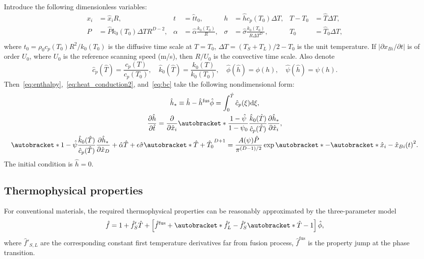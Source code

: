 \documentclass{article}
\newcommand{\dd}{\mathrm{d}}
\newcommand{\pder}[2][]{\frac{\partial#1}{\partial#2}}
\newcommand{\Pder}[2][]{\partial#1/\partial#2}
\DeclarePairedDelimiter\autobracket()       %
\newcommand{\br}[1]{\autobracket*{#1}}
\newcommand{\fusion}[1]{{#1}^\mathrm{fus}}
\begin{document}
Introduce the following dimensionless variables:
\begin{equation}\label{eq:dimensionless}
    \begin{aligned}
        x_i &= \hat{x}_iR, & t &= \hat{t}t_0, & h &= \hat{h}c_p(T_0)\Delta{T}, & T - T_0 &= \hat{T}\Delta{T}, \\
        P &= \hat{P} k_0(T_0)\Delta{T}R^{D-2}, & \alpha &= \hat{\alpha}\frac{k_0(T_0)}R, &
            \sigma &= \hat{\sigma}\frac{k_0(T_0)}{R\Delta{T}^D}, & T_0 &= \hat{T}_0\Delta{T}, \\
    \end{aligned}
\end{equation}
where \(t_0 = \rho_0 c_p(T_0) R^2/k_0(T_0)\) is the diffusive time scale at \(T=T_0\),
\(\Delta{T} = (T_S+T_L)/2 - T_0\) is the unit temperature.
If \(|\Pder[x_{Bi}]{t}|\) is of order \(U_0\), where \(U_0\) is the reference scanning speed (\si{m/s}),
then \(R/U_0\) is the convective time scale. Also denote
\begin{equation}\label{eq:dimensionless2}
    \hat{c}_p(\hat{T}) = \frac{c_p(T)}{c_p(T_0)}, \quad
    \hat{k}_0(\hat{T}) = \frac{k_0(T)}{k_0(T_0)}, \quad
    \hat{\phi}(\hat{h}) = \phi(h), \quad
    \hat{\psi}(\hat{h}) = \psi(h).
\end{equation}
Then~\eqref{eq:enthalpy},~\eqref{eq:heat_conduction2}, and~\eqref{eq:bc} take the following nondimensional form:
\begin{gather}
	\hat{h}_* \equiv \hat{h} - \fusion{\hat{h}}\hat{\phi} = \int_0^{\hat{T}} \hat{c}_p(\xi)\dd\xi, \label{eq:enthalpy_hats} \\
	\pder[\hat{h}]{\hat{t}} = \pder{\hat{x}_i}\br{
	    \frac{1-\hat{\psi}}{1-\psi_0}
	    \frac{\hat{k}_0(\hat{T})}{\hat{c}_p(\hat{T})}\pder[\hat{h}_*]{\hat{x}_i}
	}, \label{eq:heat_conduction_hats} \\
	\br{1 - \hat{\psi}} \frac{\hat{k}_0(\hat{T})}{\hat{c}_p(\hat{T})}\pder[\hat{h}_*]{\hat{x}_D} +
	    \hat{\alpha}\hat{T} + \epsilon\hat{\sigma} \br{ \hat{T} + \hat{T}_0 }^{D+1} =
	    \frac{A(\psi)\hat{P}}{\pi^{(D-1)/2}}\exp\br{ -\br{ \hat{x}_i-\hat{x}_{Bi}(t) }^2 }. \label{eq:bc_hats}
\end{gather}
The initial condition is \(\hat{h} = 0\).

\subsection{Thermophysical properties}

For conventional materials, the required thermophysical properties can be reasonably approximated by the three-parameter model
\begin{equation}\label{eq:thermophysical_model}
	\hat{f} = 1 + \hat{f}'_S\hat{T} + \left[
	    \fusion{\hat{f}} + \br{ \hat{f}'_L - \hat{f}'_S }\br{ \hat{T}-1 }
	\right]\hat{\phi},
\end{equation}
where \(\hat{f}'_{S,L}\) are the corresponding constant first temperature derivatives far from fusion process,
\(\fusion{\hat{f}}\) is the property jump at the phase transition.
\end{document}
